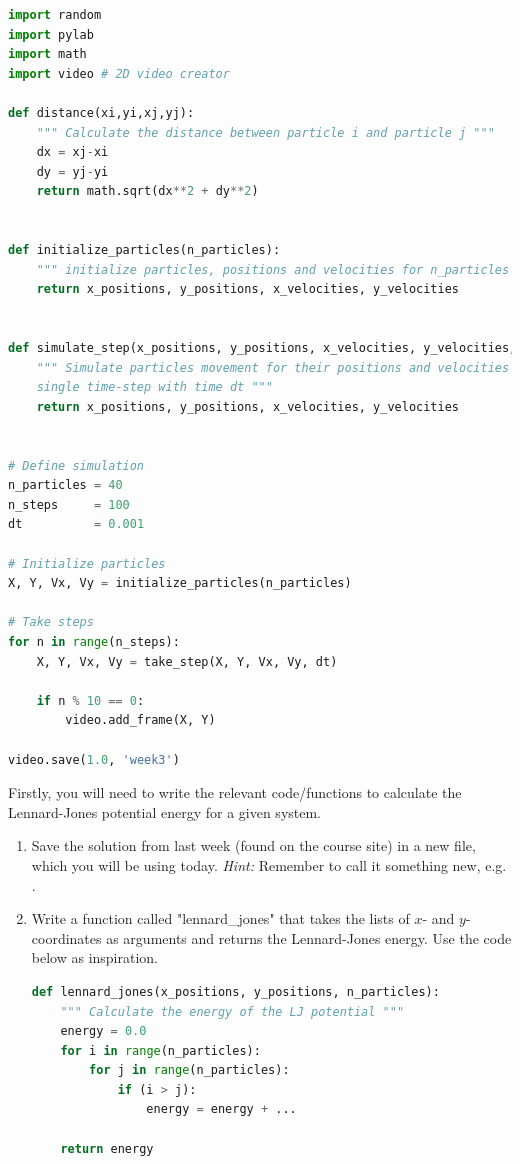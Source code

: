 \documentclass{article}
\begin{document}
\begin{lstlisting}[language=python]
import random
import pylab
import math
import video # 2D video creator

def distance(xi,yi,xj,yj):
    """ Calculate the distance between particle i and particle j """
    dx = xj-xi
    dy = yj-yi
    return math.sqrt(dx**2 + dy**2)


def initialize_particles(n_particles):
    """ initialize particles, positions and velocities for n_particles """
    return x_positions, y_positions, x_velocities, y_velocities


def simulate_step(x_positions, y_positions, x_velocities, y_velocities, dt):
    """ Simulate particles movement for their positions and velocities in a
    single time-step with time dt """
    return x_positions, y_positions, x_velocities, y_velocities


# Define simulation
n_particles = 40
n_steps     = 100
dt          = 0.001

# Initialize particles
X, Y, Vx, Vy = initialize_particles(n_particles)

# Take steps
for n in range(n_steps):
    X, Y, Vx, Vy = take_step(X, Y, Vx, Vy, dt)

    if n % 10 == 0:
        video.add_frame(X, Y)

video.save(1.0, 'week3')

\end{lstlisting}

\newpage
\clearpage


Firstly, you will need to write the relevant code/functions to calculate the
Lennard-Jones potential energy for a given system.

\begin{enumerate}

    \item Save the solution from last week (found on the course site) in a new file, which you will be using today.
        {\em Hint:} Remember to call it something new, e.g. .


    \item Write a function called "lennard\_jones" that takes the lists of $x$- and $y$-coordinates as arguments and returns the Lennard-Jones energy. Use the code below as inspiration.
\begin{lstlisting}[language=python]
def lennard_jones(x_positions, y_positions, n_particles):
    """ Calculate the energy of the LJ potential """
    energy = 0.0
    for i in range(n_particles):
        for j in range(n_particles):
            if (i > j):
                energy = energy + ...

    return energy
\end{lstlisting}

\end{enumerate}
\end{document}
